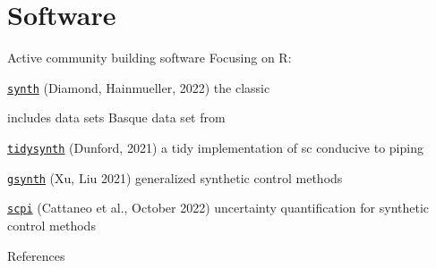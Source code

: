 \documentclass[notes,11pt, aspectratio=169]{beamer}
\newenvironment{wideitemize}{\itemize\addtolength{\itemsep}{10pt}}{\enditemize}
\begin{document}
\section{Software}

\begin{frame}{Active community building software}
    Focusing on R: 
    \medskip

    \begin{wideitemize}
        \item \textcolor{blue}{\texttt{\href{https://cran.r-project.org/web/packages/Synth/index.html}{synth}}} (Diamond, Hainmueller, 2022) the classic 
            \begin{wideitemize} 
            \item includes data sets Basque data set from \cite{abadie_economic_2003} 
            \end{wideitemize}
        \item \textcolor{blue}{\texttt{\href{https://cran.r-project.org/web/packages/tidysynth/index.html}{tidysynth}}} (Dunford, 2021) a tidy implementation of sc conducive to piping 
        \item \textcolor{blue}{\texttt{\href{https://yiqingxu.org/packages/gsynth/}{gsynth}}} (Xu, Liu 2021) generalized synthetic control methods
        \item \textcolor{blue}{\texttt{\href{https://nppackages.github.io/scpi/}{scpi}}} (Cattaneo et al., October 2022) uncertainty quantification for synthetic control methods
    \end{wideitemize}
\end{frame}
   
\begin{frame}[allowframebreaks]{References}
\printbibliography
\end{frame}
\end{document}

